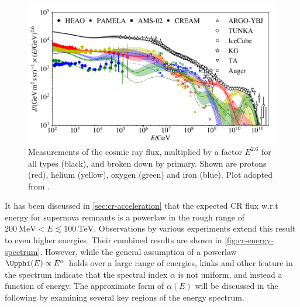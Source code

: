 \begin{figure}
	\centering
	\includegraphics[width=1\textwidth]{./plots/cosmic_ray_spectrum.png}
	\caption{Measurements of the cosmic ray flux, multiplied by a factor $E^{2.6}$ for all types (black), and broken down by primary. Shown are protons (red), 
	helium (yellow), oxygen (green) and iron (blue). Plot adopted from \cite{dembinski2017data}.}
	\label{fig:cr-energy-spectrum}
\end{figure}

It has been discussed in \autoref{sec:cr-acceleration} that the expected CR flux w.r.t energy for supernova remnants is a powerlaw in the rough range of 
$\SI{200}{\mega\electronvolt} < E \lesssim \SI{100}{\tera\electronvolt}$. Observations by various experiments extend this result to even higher energies. Their 
combined results are shown in \autoref{fig:cr-energy-spectrum}. However, while the general assumption of a powerlaw $\Upphi(E)\propto E^\alpha$ holds over a large
range of energies, kinks and other feature in the spectrum indicate that the spectral index $\alpha$ is not uniform, and instead a function of energy. The 
approximate form of $\alpha(E)$ will be discussed in the following by examining several key regions of the energy spectrum. 

